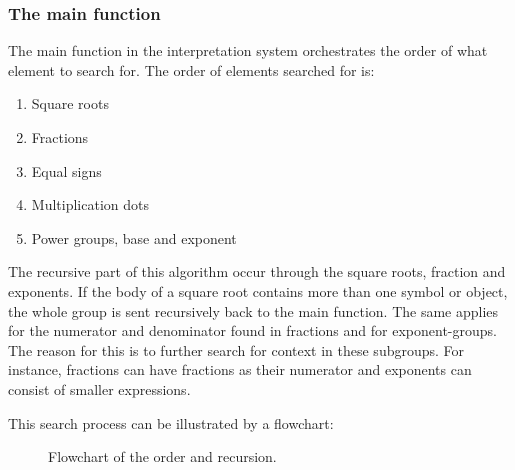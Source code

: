 \subsubsection{The main function}
The main function in the interpretation system orchestrates the order of what element to search for. The order of elements searched for is:

\begin{enumerate}
    \setlength\itemsep{0.3em}
    \item Square roots
    \item Fractions
    \item Equal signs
    \item Multiplication dots
    \item Power groups, base and exponent
\end{enumerate}

The recursive part of this algorithm occur through the square roots, fraction and exponents. If the body of a square root contains more than one symbol or object, the whole group is sent recursively back to the main function. The same applies for the numerator and denominator found in fractions and for exponent-groups. The reason for this is to further search for context in these subgroups. For instance, fractions can have fractions as their numerator and exponents can consist of smaller expressions. 

This search process can be illustrated by a flowchart:

\begin{figure}[H]
\centering
    \caption{Flowchart of the order and recursion.}

\label{fig:interpretation_flowchart}
\end{figure}


